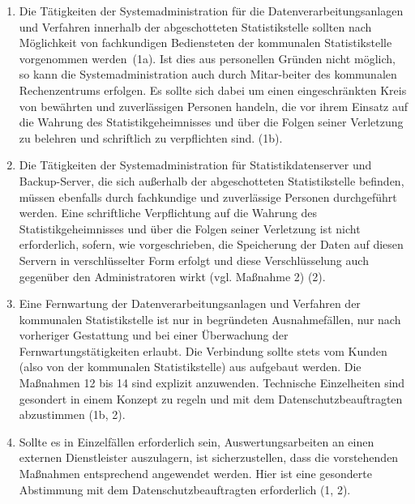\begin{enumerate}[label=\arabic*.]
            \item Die Tätigkeiten der Systemadministration für die Datenverarbeitungsanlagen und Verfahren innerhalb der abgeschotteten Statistikstelle sollten nach Möglichkeit von fachkundigen Bediensteten der kommunalen Statistikstelle vorgenommen werden~(1a). Ist dies aus personellen Gründen nicht möglich, so kann die Systemadministration auch durch Mitar-beiter des kommunalen Rechenzentrums erfolgen. Es sollte sich dabei um einen eingeschränkten Kreis von bewährten und zuverlässigen Personen handeln, die vor ihrem Einsatz auf die Wahrung des Statistikgeheimnisses und über die Folgen seiner Verletzung zu belehren und schriftlich zu verpflichten sind. (1b).
            \item Die Tätigkeiten der Systemadministration für Statistikdatenserver und Backup-Server, die sich außerhalb der abgeschotteten Statistikstelle befinden, müssen ebenfalls durch fachkundige und zuverlässige Personen durchgeführt werden. Eine schriftliche Verpflichtung auf die Wahrung des Statistikgeheimnisses und über die Folgen seiner Verletzung ist nicht erforderlich, sofern, wie vorgeschrieben, die Speicherung der Daten auf diesen Servern in verschlüsselter Form erfolgt und diese Verschlüsselung auch gegenüber den Administratoren wirkt (vgl. Maßnahme 2) (2).
            \item Eine Fernwartung der Datenverarbeitungsanlagen und Verfahren der kommunalen Statistikstelle ist nur in begründeten Ausnahmefällen, nur nach vorheriger Gestattung und bei einer Überwachung der Fernwartungstätigkeiten erlaubt. Die Verbindung sollte stets vom Kunden (also von der kommunalen Statistikstelle) aus aufgebaut werden. Die Maßnahmen 12 bis 14 sind explizit anzuwenden. Technische Einzelheiten sind gesondert in einem Konzept zu regeln und mit dem Datenschutzbeauftragten abzustimmen (1b, 2).
            \item Sollte es in Einzelfällen erforderlich sein, Auswertungsarbeiten an einen externen Dienstleister auszulagern, ist sicherzustellen, dass die vorstehenden Maßnahmen entsprechend angewendet werden. Hier ist eine gesonderte Abstimmung mit dem Datenschutzbeauftragten erforderlich (1, 2).
        \end{enumerate}
